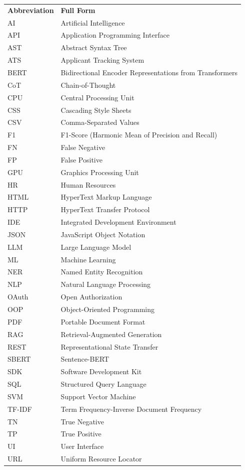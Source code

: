 \documentclass[12pt,a4paper]{report}
\begin{document}
\begin{longtable}{@{}p{3.5cm}p{11cm}@{}}
\textbf{Abbreviation} & \textbf{Full Form} \\[0.5em]
AI & Artificial Intelligence \\
API & Application Programming Interface \\
AST & Abstract Syntax Tree \\
ATS & Applicant Tracking System \\
BERT & Bidirectional Encoder Representations from Transformers \\
CoT & Chain-of-Thought \\
CPU & Central Processing Unit \\
CSS & Cascading Style Sheets \\
CSV & Comma-Separated Values \\
F1 & F1-Score (Harmonic Mean of Precision and Recall) \\
FN & False Negative \\
FP & False Positive \\
GPU & Graphics Processing Unit \\
HR & Human Resources \\
HTML & HyperText Markup Language \\
HTTP & HyperText Transfer Protocol \\
IDE & Integrated Development Environment \\
JSON & JavaScript Object Notation \\
LLM & Large Language Model \\
ML & Machine Learning \\
NER & Named Entity Recognition \\
NLP & Natural Language Processing \\
OAuth & Open Authorization \\
OOP & Object-Oriented Programming \\
PDF & Portable Document Format \\
RAG & Retrieval-Augmented Generation \\
REST & Representational State Transfer \\
SBERT & Sentence-BERT \\
SDK & Software Development Kit \\
SQL & Structured Query Language \\
SVM & Support Vector Machine \\
TF-IDF & Term Frequency-Inverse Document Frequency \\
TN & True Negative \\
TP & True Positive \\
UI & User Interface \\
URL & Uniform Resource Locator \\
\end{longtable}
\end{document}

